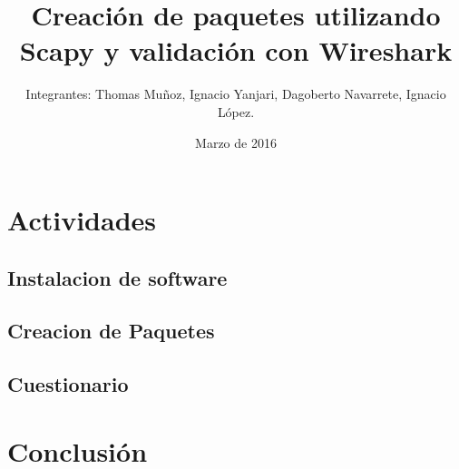 \documentclass{udpreport}
\title{Creación de paquetes utilizando Scapy y validación con Wireshark}
\author{Integrantes: Thomas Muñoz, Ignacio Yanjari, Dagoberto Navarrete, Ignacio López.}
\date{Marzo de 2016}
\begin{document}
\maketitle
\tableofcontents
\chapter{Actividades}
	\section{Instalacion de software}

	\section{Creacion de Paquetes}
		
	\section{Cuestionario}
		

\chapter{Conclusión}
  
\begin{thebibliography}{x}

\end{thebibliography}
\end{document}
